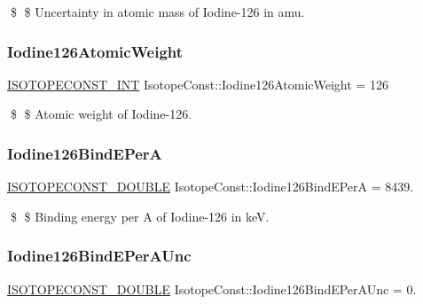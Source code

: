 \$ \$ Uncertainty in atomic mass of Iodine-\/126 in amu. \mbox{\label{group___isotope_const-_iodine-_i126_gaf4eb3e2b4fff2a32128b51bc44c94998}} 
\subsubsection{\texorpdfstring{Iodine126\+Atomic\+Weight}{Iodine126AtomicWeight}}
{\footnotesize\ttfamily \mbox{\hyperlink{group___isotope_const-_macros_ga5f18360b3e99483a35c32d789e62621c}{I\+S\+O\+T\+O\+P\+E\+C\+O\+N\+S\+T\+\_\+\+I\+NT}} Isotope\+Const\+::\+Iodine126\+Atomic\+Weight = 126}

\$ \$ Atomic weight of Iodine-\/126. \mbox{\label{group___isotope_const-_iodine-_i126_ga49b4279388b940a91c0539a530e2a4cc}} 
\subsubsection{\texorpdfstring{Iodine126\+Bind\+E\+PerA}{Iodine126BindEPerA}}
{\footnotesize\ttfamily \mbox{\hyperlink{group___isotope_const-_macros_ga8f45a7272ce02c0b4c65c44636ed719a}{I\+S\+O\+T\+O\+P\+E\+C\+O\+N\+S\+T\+\_\+\+D\+O\+U\+B\+LE}} Isotope\+Const\+::\+Iodine126\+Bind\+E\+PerA = 8439.}

\$ \$ Binding energy per A of Iodine-\/126 in keV. \mbox{\label{group___isotope_const-_iodine-_i126_ga4f1dd1f988bb9f1a26dc32e6528acae1}} 
\subsubsection{\texorpdfstring{Iodine126\+Bind\+E\+Per\+A\+Unc}{Iodine126BindEPerAUnc}}
{\footnotesize\ttfamily \mbox{\hyperlink{group___isotope_const-_macros_ga8f45a7272ce02c0b4c65c44636ed719a}{I\+S\+O\+T\+O\+P\+E\+C\+O\+N\+S\+T\+\_\+\+D\+O\+U\+B\+LE}} Isotope\+Const\+::\+Iodine126\+Bind\+E\+Per\+A\+Unc = 0.}

